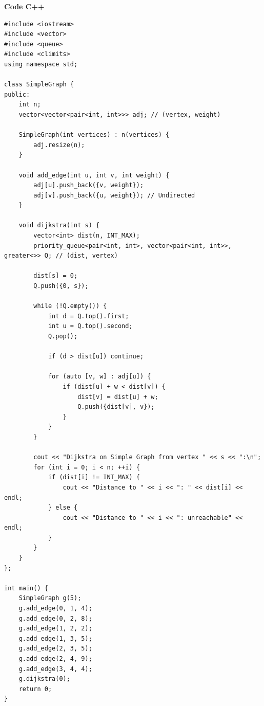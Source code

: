 \documentclass[a4paper,12pt]{article}
\begin{document}
\textbf{Code C++}
\lstset{language=C++}
\begin{lstlisting}
#include <iostream>
#include <vector>
#include <queue>
#include <climits>
using namespace std;

class SimpleGraph {
public:
    int n;
    vector<vector<pair<int, int>>> adj; // (vertex, weight)

    SimpleGraph(int vertices) : n(vertices) {
        adj.resize(n);
    }

    void add_edge(int u, int v, int weight) {
        adj[u].push_back({v, weight});
        adj[v].push_back({u, weight}); // Undirected
    }

    void dijkstra(int s) {
        vector<int> dist(n, INT_MAX);
        priority_queue<pair<int, int>, vector<pair<int, int>>, greater<>> Q; // (dist, vertex)

        dist[s] = 0;
        Q.push({0, s});

        while (!Q.empty()) {
            int d = Q.top().first;
            int u = Q.top().second;
            Q.pop();

            if (d > dist[u]) continue;

            for (auto [v, w] : adj[u]) {
                if (dist[u] + w < dist[v]) {
                    dist[v] = dist[u] + w;
                    Q.push({dist[v], v});
                }
            }
        }

        cout << "Dijkstra on Simple Graph from vertex " << s << ":\n";
        for (int i = 0; i < n; ++i) {
            if (dist[i] != INT_MAX) {
                cout << "Distance to " << i << ": " << dist[i] << endl;
            } else {
                cout << "Distance to " << i << ": unreachable" << endl;
            }
        }
    }
};

int main() {
    SimpleGraph g(5);
    g.add_edge(0, 1, 4);
    g.add_edge(0, 2, 8);
    g.add_edge(1, 2, 2);
    g.add_edge(1, 3, 5);
    g.add_edge(2, 3, 5);
    g.add_edge(2, 4, 9);
    g.add_edge(3, 4, 4);
    g.dijkstra(0);
    return 0;
}
\end{lstlisting}
\end{document}
